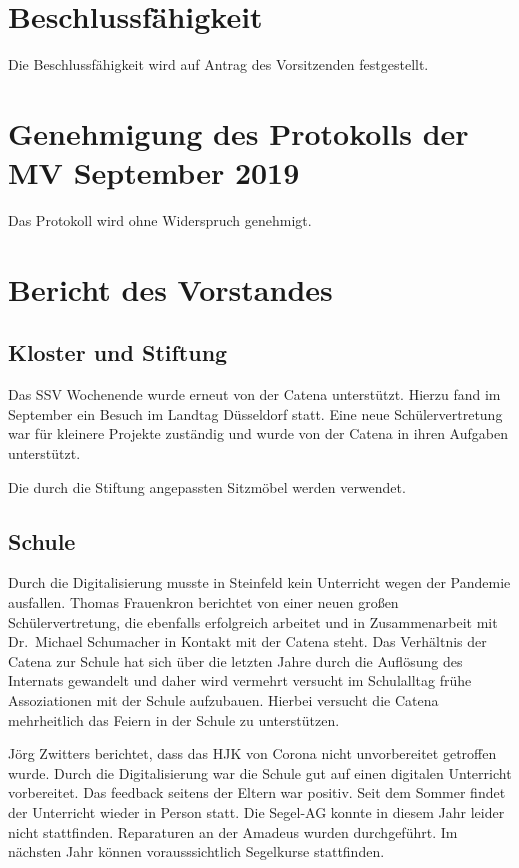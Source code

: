 \documentclass[a4paper, 11pt]{article}
\begin{document}
\section*{Beschlussfähigkeit}

Die Beschlussfähigkeit wird auf Antrag des Vorsitzenden festgestellt.

\section*{Genehmigung des Protokolls der MV September 2019}

Das Protokoll wird ohne Widerspruch genehmigt.

\section*{Bericht des Vorstandes}

\subsection*{Kloster und Stiftung}

Das SSV Wochenende wurde erneut von der Catena unterstützt. Hierzu fand im September ein Besuch im Landtag Düsseldorf statt.
Eine neue Schülervertretung war für kleinere Projekte zuständig und wurde von der Catena in ihren Aufgaben unterstützt.

Die durch die Stiftung angepassten Sitzmöbel werden verwendet.

\subsection*{Schule}

Durch die Digitalisierung musste in Steinfeld kein Unterricht wegen der Pandemie ausfallen.
Thomas Frauenkron berichtet von einer neuen großen Schülervertretung, die ebenfalls erfolgreich arbeitet und in Zusammenarbeit mit Dr.~Michael Schumacher in Kontakt mit der Catena steht.
Das Verhältnis der Catena zur Schule hat sich über die letzten Jahre durch die Auflösung des Internats gewandelt und daher wird vermehrt versucht im Schulalltag frühe Assoziationen mit der Schule aufzubauen.
Hierbei versucht die Catena mehrheitlich das Feiern in der Schule zu unterstützen.

Jörg Zwitters berichtet, dass das HJK von Corona nicht unvorbereitet getroffen wurde. Durch die Digitalisierung war die Schule gut auf einen digitalen Unterricht vorbereitet. Das feedback seitens der Eltern war positiv.
Seit dem Sommer findet der Unterricht wieder in Person statt.
Die Segel-AG konnte in diesem Jahr leider nicht stattfinden. Reparaturen an der Amadeus wurden durchgeführt. Im nächsten Jahr können vorausssichtlich Segelkurse stattfinden.
\end{document}
